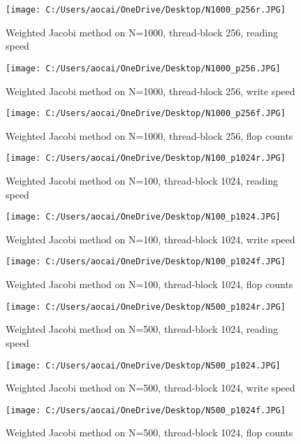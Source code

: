 \documentclass[12pt]{article}
\begin{document}
\begin{figure}[H]
	\centering
	\texttt{[image: C:/Users/aocai/OneDrive/Desktop/N1000\_p256r.JPG]}
	\caption[Optional caption]{Weighted Jacobi method on N=1000, thread-block 256, reading speed}
	\label{fig:N1000_p256r}
\end{figure}
\begin{figure}[H]
	\centering
	\texttt{[image: C:/Users/aocai/OneDrive/Desktop/N1000\_p256.JPG]}
	\caption[Optional caption]{Weighted Jacobi method on N=1000, thread-block 256, write speed}
	\label{fig:N1000_p256w}
\end{figure}
\begin{figure}[H]
	\centering
	\texttt{[image: C:/Users/aocai/OneDrive/Desktop/N1000\_p256f.JPG]}
	\caption[Optional caption]{Weighted Jacobi method on N=1000, thread-block 256, flop counts}
	\label{fig:N1000_p256f}
\end{figure}
\begin{figure}[H]
	\centering
	\texttt{[image: C:/Users/aocai/OneDrive/Desktop/N100\_p1024r.JPG]}
	\caption[Optional caption]{Weighted Jacobi method on N=100, thread-block 1024, reading speed}
	\label{fig:N100_p1024r}
\end{figure}
\begin{figure}[H]
	\centering
	\texttt{[image: C:/Users/aocai/OneDrive/Desktop/N100\_p1024.JPG]}
	\caption[Optional caption]{Weighted Jacobi method on N=100, thread-block 1024, write speed}
	\label{fig:N100_p1024w}
\end{figure}
\begin{figure}[H]
	\centering
	\texttt{[image: C:/Users/aocai/OneDrive/Desktop/N100\_p1024f.JPG]}
	\caption[Optional caption]{Weighted Jacobi method on N=100, thread-block 1024, flop counts}
	\label{fig:N100_p1024f}
\end{figure}
\begin{figure}[H]
	\centering
	\texttt{[image: C:/Users/aocai/OneDrive/Desktop/N500\_p1024r.JPG]}
	\caption[Optional caption]{Weighted Jacobi method on N=500, thread-block 1024, reading speed}
	\label{fig:N500_p1024r}
\end{figure}
\begin{figure}[H]
	\centering
	\texttt{[image: C:/Users/aocai/OneDrive/Desktop/N500\_p1024.JPG]}
	\caption[Optional caption]{Weighted Jacobi method on N=500, thread-block 1024, write speed}
	\label{fig:N500_p1024w}
\end{figure}
\begin{figure}[H]
	\centering
	\texttt{[image: C:/Users/aocai/OneDrive/Desktop/N500\_p1024f.JPG]}
	\caption[Optional caption]{Weighted Jacobi method on N=500, thread-block 1024, flop counts}
	\label{fig:N500_p1024f}
\end{figure}
\end{document}
